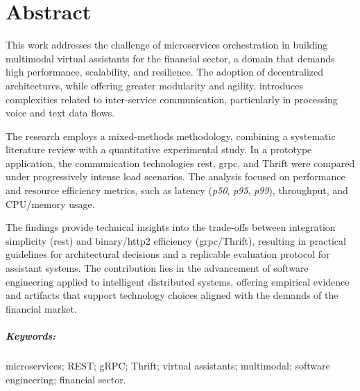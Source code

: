 \chapter*{Abstract}
This work addresses the challenge of microservices orchestration in building multimodal virtual assistants for the financial sector, a domain that demands high performance, scalability, and resilience. The adoption of decentralized architectures, while offering greater modularity and agility, introduces complexities related to inter-service communication, particularly in processing voice and text data flows.

The research employs a mixed-methods methodology, combining a systematic literature review with a quantitative experimental study. In a prototype application, the communication technologies \gls{rest}, \gls{grpc}, and Thrift were compared under progressively intense load scenarios. The analysis focused on performance and resource efficiency metrics, such as latency (\textit{p50}, \textit{p95}, \textit{p99}), throughput, and CPU/memory usage.

The findings provide technical insights into the trade-offs between integration simplicity (\gls{rest}) and binary/\acrshort{http}2 efficiency (\acrshort{grpc}/Thrift), resulting in practical guidelines for architectural decisions and a replicable evaluation protocol for assistant systems. The contribution lies in the advancement of software engineering applied to intelligent distributed systems, offering empirical evidence and artifacts that support technology choices aligned with the demands of the financial market.

\paragraph{Keywords:} microservices; REST; gRPC; Thrift; virtual assistants; multimodal; software engineering; financial sector.